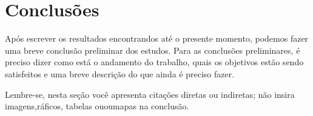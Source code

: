 \chapter{Conclusões} \label{cap:06}

Após escrever os resultados encontrandos até o presente momento, podemos fazer uma breve conclusão preliminar dos estudos. Para as conclusões preliminares, é preciso dizer como está o andamento do trabalho, quais os objetivos estão sendo satisfeitos e uma breve descrição do que ainda é preciso fazer.

Lembre-se, nesta seção você apresenta citações diretas ou indiretas; não insira imagens,ráficos, tabelas ououmapas na conclusão.